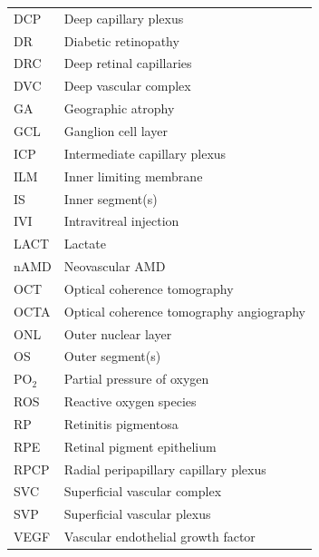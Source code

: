 \documentclass{article}
\begin{document}
\begin{xltabular}{\paperheight}{ll}
  DCP           & Deep capillary plexus                                     \\
  DR            & Diabetic retinopathy                                      \\
  DRC           & Deep retinal   capillaries                                \\
  DVC           & Deep vascular complex                                     \\
  GA            & Geographic atrophy \\
  GCL & Ganglion cell layer\\
  ICP           & Intermediate   capillary plexus                           \\
  ILM           & Inner limiting   membrane                                 \\
  IS            & Inner segment(s)                                          \\
  IVI           & Intravitreal   injection                                  \\
  LACT          & Lactate                                                   \\
  nAMD          & Neovascular AMD                                       \\
  OCT           & Optical coherence   tomography                            \\
  OCTA           & Optical coherence tomography angiography                 \\
  ONL           & Outer nuclear layer                                       \\
  OS            & Outer segment(s)                                          \\
  PO$_2$        & Partial pressure of   oxygen                              \\
  ROS           & Reactive oxygen   species                                 \\
  RP            & Retinitis   pigmentosa                                    \\
  RPE           & Retinal pigment   epithelium                              \\
  RPCP          & Radial peripapillary   capillary plexus                   \\
  SVC           & Superficial vascular   complex                            \\
  SVP           & Superficial vascular   plexus                             \\
  VEGF          & Vascular endothelial   growth factor        \\
  \bottomrule %
\end{xltabular}
\end{document}
